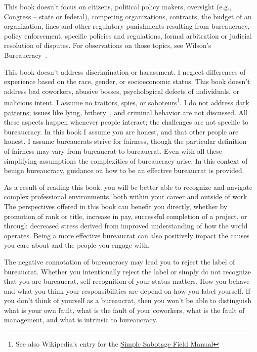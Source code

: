 This book doesn't focus on citizens, political policy makers, oversight (e.g., Congress -- state or federal), competing organizations, contracts, the budget of an organization, fines and other regulatory punishments resulting from bureaucracy, policy enforcement, specific policies and regulations, formal arbitration or judicial resolution of disputes. For observations on those topics, see Wilson's Bureaucracy~\cite{1991_Wilson}. 



This book doesn't address discrimination or harassment. I neglect differences of experience based on the race, gender, or socioeconomic status. This book doesn't address bad coworkers, abusive bosses, psychological defects of individuals, or malicious intent. I assume no traitors, spies, or \href{https://www.hsdl.org/?abstract&did=750070}{saboteurs}\footnote{See also Wikipedia's entry for the \href{https://en.wikisource.org/wiki/Simple_Sabotage_Field_Manual}{Simple Sabotage Field Manual}}.
I do not address \href{https://en.wikipedia.org/wiki/Dark_pattern}{dark patterns}; issues like lying, bribery~\cite{2021_Ang}, and criminal behavior are not discussed. All these aspects happen whenever people interact; the challenges are not specific to bureaucracy. In this book I assume you are honest, and that other people are honest.  
I assume bureaucrats strive for fairness, though the particular definition of fairness may vary from bureaucrat to bureaucrat. 
Even with all these simplifying assumptions the complexities of bureaucracy arise. In this context of benign bureaucracy, guidance on how to be an effective bureaucrat is provided.


As a result of reading this book, you will be better able to recognize and navigate complex professional environments, both within your career and outside of work. The perspectives offered in this book can benefit you directly, whether by promotion of rank or title, increase in pay, successful completion of a project, or through decreased stress derived from improved understanding of how the world operates. Being a more effective bureaucrat can also positively impact the causes you care about and the people you engage with.

The negative connotation of bureaucracy may lead you to reject the label of bureaucrat. Whether you intentionally reject the label or simply do not recognize that you are bureaucrat, self-recognition of your status matters. How you behave and what you think your responsibilities are depend on how you label yourself.
If you don't think of yourself as a bureaucrat, then you won't be able to distinguish what is your own fault, what is the fault of your coworkers, what is the fault of management, and what is intrinsic to bureaucracy. 



